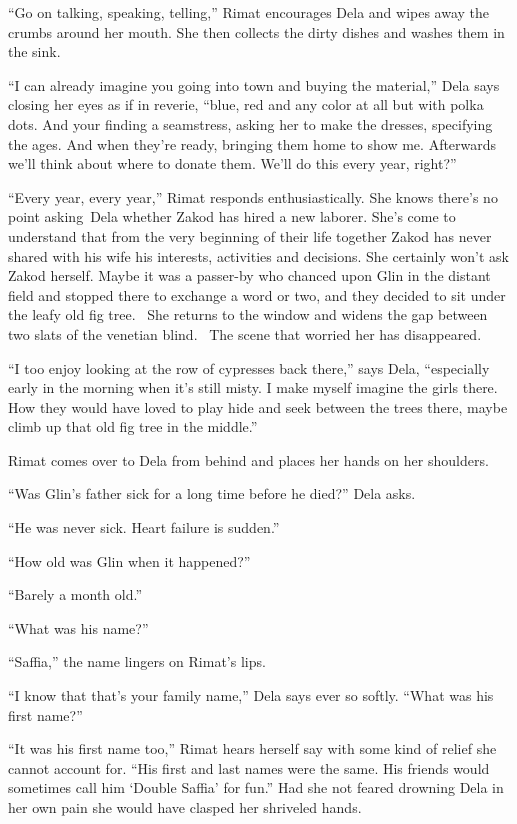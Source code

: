 \documentclass[twoside,11pt]{book}
\begin{document}
``Go on talking, speaking, telling,'' Rimat encourages Dela and wipes away the crumbs around
her mouth. She then collects the dirty dishes and washes them in the sink.

``I can already imagine you going into town and buying the material,'' Dela says closing her
eyes as if in reverie, ``blue, red and any color at all but with polka dots. And your finding a
seamstress, asking her to make the dresses, specifying the ages. And when they're ready, bringing them home to show me.
Afterwards we'll think about where to donate them. We'll do this every year, right?''

``Every year, every year,'' Rimat responds enthusiastically. She knows there's no point
asking~Dela whether Zakod has hired a new laborer. She's come to understand that from the very beginning of their life
together Zakod has never shared with his wife his interests, activities and decisions{. }She certainly
won't{ }ask Zakod herself. Maybe it was a passer-by who chanced upon Glin in the distant field and
stopped there to exchange a word or two, and they decided to sit under the{ }leafy old fig tree.~ She
returns to the window and widens the gap between two slats of the venetian blind. ~The scene that worried her has
disappeared.

``I too enjoy looking at the row of cypresses back there,'' says Dela,
``especially early in the morning when it's still misty. I make myself imagine the girls there. How they
would have loved to play hide and seek between the trees there, maybe climb up that old fig tree in the
middle.''

Rimat comes over to Dela from behind and places her hands on her shoulders.

``Was Glin's father sick for a long time before he died?'' Dela asks.

``He was never sick. Heart failure is sudden.''

``How old was Glin when it happened?''

``Barely a month old.''

``What was his name?''

``Saffia,'' the name lingers on Rimat's lips.

``I know that that's your family name,'' Dela says ever so softly. ``What was his
first name?''

``It was his first name too,'' Rimat hears herself say with some kind of relief she cannot
account for. ``His first and last names were the same. His friends would sometimes call him `Double
Saffia' for fun.''  Had she not feared drowning Dela in her own pain she would have clasped her
shriveled hands.
\end{document}
